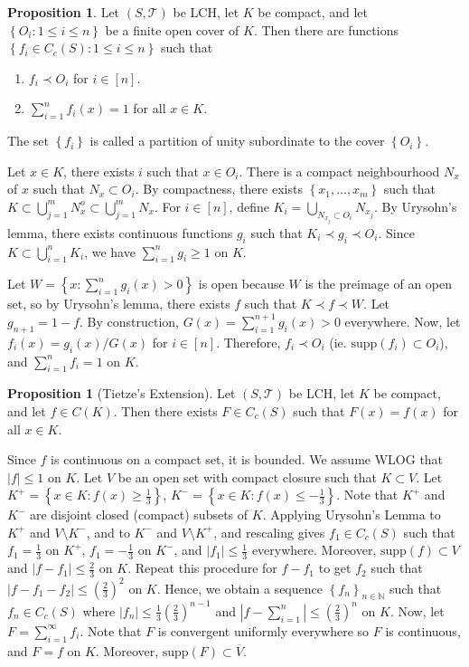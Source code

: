 \documentclass[11pt]{article}
\theoremstyle{definition}
\newtheorem{prop}[thm]{Proposition}
\newcommand{\sm}[0]{\setminus}
\newcommand{\set}[1]{\left\{ #1 \right\}}
\newcommand{\abs}[1]{\left\lvert#1\right\rvert} %
\newcommand{\NN}{\mathbb{N}}
\newcommand{\m}[1]{\mathcal{#1}}
\begin{document}

\begin{prop}
Let $(S,\m{T})$ be LCH, let $K$ be compact, and let $\set{O_i:1\le i\le n}$ be a finite
open cover of $K$. Then there are functions $\set{f_i\in C_c(S):1\le i\le n}$ such that
\begin{enumerate}
\item $f_i\prec O_i$ for $i\in[n]$.
\item $\sum_{i=1}^nf_i(x)=1$ for all $x\in K$.
\end{enumerate}
The set $\set{f_i}$ is called a partition of unity subordinate to the cover $\set{O_i}$.
\end{prop}
\proof
Let $x\in K$, there exists $i$ such that $x\in O_i$. There is a compact neighbourhood $N_x$
of $x$ such that $N_x\subset O_i$. By compactness, there exists $\set{x_1,...,x_m}$ such
that $K\subset\bigcup_{j=1}^mN_x^o\subset\bigcup_{j=1}^mN_x$. For $i\in[n]$, define
$K_i=\bigcup_{N_{x_j}\subset O_i}N_{x_j}$. By Urysohn's lemma, there exists continuous
functions $g_i$ such that $K_i\prec g_i\prec O_i$. Since $K\subset\bigcup_{i=1}^nK_i$, we
have $\sum_{i=1}^ng_i\ge1$ on $K$.

Let $W=\set{x:\sum_{i=1}^ng_i(x)>0}$ is open because $W$ is the preimage of an open set, so
by Urysohn's lemma, there exists $f$ such that $K\prec f\prec W$. Let $g_{n+1}=1-f$. By
construction, $G(x)=\sum_{i=1}^{n+1}g_i(x)>0$ everywhere. Now, let $f_i(x)=g_i(x)/G(x)$ for
$i\in[n]$. Therefore, $f_i\prec O_i$ (ie. $\text{supp}(f_i)\subset O_i$), and
$\sum_{i=1}^nf_i=1$ on $K$.
\qedhere

\begin{prop}[Tietze's Extension]
Let $(S,\m{T})$ be LCH, let $K$ be compact, and let $f\in C(K)$. Then there exists $F\in
C_c(S)$ such that $F(x)=f(x)$ for all $x\in K$.
\end{prop}
\proof
Since $f$ is continuous on a compact set, it is bounded. We assume WLOG that $\abs{f}\le1$
on $K$. Let $V$ be an open set with compact closure such that $K\subset V$. Let
$K^+=\set{x\in K:f(x)\ge\frac13}$, $K^-=\set{x\in K:f(x)\le-\frac13}$. Note that $K^+$ and
$K^-$ are disjoint closed (compact) subsets of $K$. Applying Urysohn's Lemma to $K^+$ and
$V\sm K^-$, and to $K^-$ and $V\sm K^+$, and rescaling gives $f_1\in C_c(S)$ such that
$f_1=\frac13$ on $K^+$, $f_1=-\frac13$ on $K^-$, and $\abs{f_1}\le\frac13$ everywhere.
Moreover, $\text{supp}(f)\subset V$ and $\abs{f-f_1}\le\frac23$ on $K$. Repeat this
procedure for $f-f_1$ to get $f_2$ such that $\abs{f-f_1-f_2}\le\left(\frac23\right)^2$ on
$K$. Hence, we obtain a sequence $\set{f_n}_{n\in\NN}$ such that $f_n\in C_c(S)$ where
$\abs{f_n}\le\frac13\left(\frac23\right)^{n-1}$ and
$\abs{f-\sum_{i=1}^n}\le\left(\frac23\right)^n$ on $K$. Now, let $F=\sum_{i=1}^\infty f_i$.
Note that $F$ is convergent uniformly everywhere so $F$ is continuous, and $F=f$ on $K$.
Moreover, $\text{supp}(F)\subset\overline{V}$.
\qedhere
\end{document}
